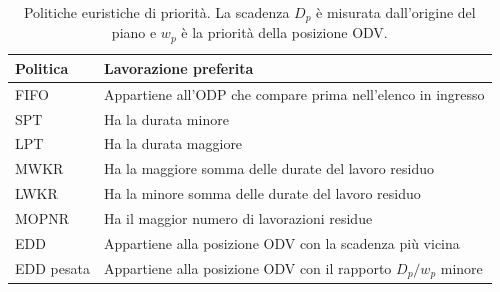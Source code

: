 \begin{table}[htbp]
\centering
\small
\begin{tabular}{@{}lp{}@{}}
\toprule
\textbf{Politica} & \textbf{Lavorazione preferita}\\
\midrule
FIFO & Appartiene all'ODP che compare prima nell'elenco in ingresso\\
SPT & Ha la durata minore\\
LPT & Ha la durata maggiore\\
MWKR & Ha la maggiore somma delle durate del lavoro residuo\\
LWKR & Ha la minore somma delle durate del lavoro residuo\\
MOPNR & Ha il maggior numero di lavorazioni residue\\
EDD & Appartiene alla posizione ODV con la scadenza più vicina\\
EDD pesata & Appartiene alla posizione ODV con il rapporto $D_p/w_p$ minore\\
\bottomrule
\end{tabular}
\caption{Politiche euristiche di priorità. La scadenza $D_p$ è misurata dall'origine del piano e $w_p$ è la priorità della posizione ODV.}
\label{tab:scheduling-priority-rules}
\end{table}
